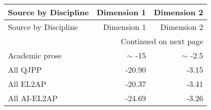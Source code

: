 \begin{longtable}{lrr}
\toprule
Source by Discipline & Dimension 1 & Dimension 2 \\
\midrule
\endfirsthead
\toprule
Source by Discipline & Dimension 1 & Dimension 2 \\
\midrule
\endhead
\midrule
\multicolumn{3}{r}{Continued on next page} \\
\midrule
\endfoot
\bottomrule
\endlastfoot
Academic prose \citep{biber_variation_1988} & $\sim$ -15 & $\sim$ -2.5 \\
\hline
All QJPP & -20.90 & -3.15 \\
All EL2AP & -20.37 & -3.41 \\
All AI-EL2AP & -24.69 & -3.26 \\
\end{longtable}
